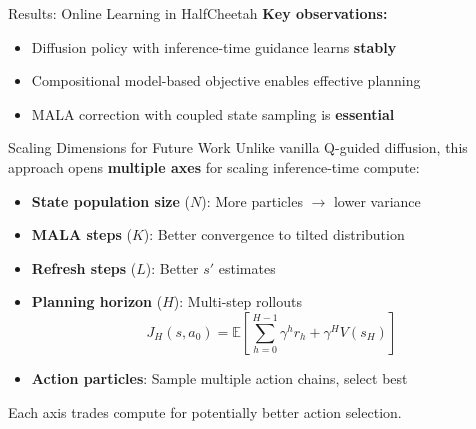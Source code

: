 \documentclass[final,hyperref={pdfpagelabels=false}]{beamer}
\newlength{\colwidth}
\begin{document}
\begin{frame}[t]
\begin{columns}[t]
\begin{column}{\colwidth}
\begin{block}{\Large Results: Online Learning in HalfCheetah}
\vspace{0.5em}
\textbf{Key observations:}
\begin{itemize}
    \item Diffusion policy with inference-time guidance learns \textbf{stably}
    \item Compositional model-based objective enables effective planning
    \item MALA correction with coupled state sampling is \textbf{essential}
\end{itemize}
\end{block}

\vspace{1cm}

\begin{block}{\Large Scaling Dimensions for Future Work}
Unlike vanilla Q-guided diffusion, this approach opens \textbf{multiple axes} for scaling inference-time compute:

\vspace{0.5em}
\begin{itemize}
    \item \textbf{State population size} ($N$): More particles $\to$ lower variance
    \item \textbf{MALA steps} ($K$): Better convergence to tilted distribution
    \item \textbf{Refresh steps} ($L$): Better $s'$ estimates
    \item \textbf{Planning horizon} ($H$): Multi-step rollouts
    \[
    J_H(s, a_0) = \mathbb{E}\left[\sum_{h=0}^{H-1} \gamma^h r_h + \gamma^H V(s_H)\right]
    \]
    \item \textbf{Action particles}: Sample multiple action chains, select best
\end{itemize}

\vspace{0.5em}
Each axis trades compute for potentially better action selection.
\end{block}

\end{column}

\end{columns}

\end{frame}
\end{document}
